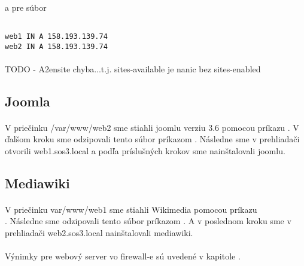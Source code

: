 \paragraph{}
a pre súbor 

\noindent
{\selectfont
\begin{small}
\begin{verbatim}

web1 IN A 158.193.139.74
web2 IN A 158.193.139.74

\end{verbatim}
\end{small}
}


\paragraph{}
TODO - A2ensite chyba...t.j. sites-available je nanic bez sites-enabled


\subsection{Joomla}
\paragraph{}
V priečinku /var/www/web2 sme stiahli joomlu verziu 3.6 pomocou príkazu  . V ďalšom kroku sme odzipovali tento súbor príkazom  . Nás\-ledne sme v prehliadači otvorili web1.sos3.local a podľa príslušných krokov sme nainštalovali joomlu.

\subsection{Mediawiki}
\paragraph{}
V priečinku var/www/web1 sme stiahli Wikimedia pomocou príkazu\\  . Následne sme odzipovali tento súbor príkazom  . A v poslednom kroku sme v prehliadači web2.sos3.local nainštalovali mediawiki.

\paragraph{}
Výnimky pre webový server vo firewall-e sú uvedené v kapitole .

